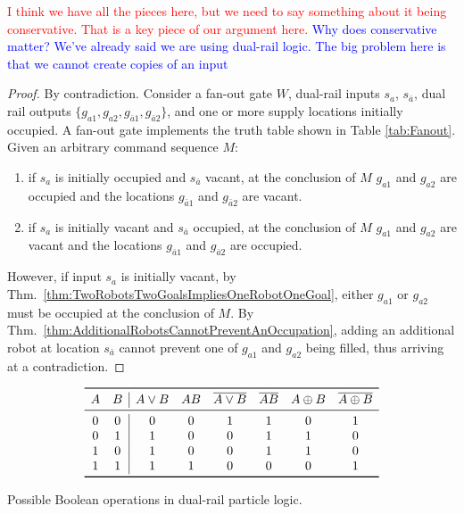 \documentclass[letterpaper, 10 pt, conference]{ieeeconf}
\begin{document}
\textcolor{red}{I think we have all the pieces here, but we need to say something about it being conservative. That is a key piece of our argument here. }
\textcolor{blue}{Why does conservative matter?  We've already said we are using dual-rail logic.  The big problem here is that we cannot create copies of an input}

\begin{proof} By contradiction.
Consider a  {\sc fan-out} gate $W$,  dual-rail inputs  $s_{a}$, $s_{\bar{a}}$, dual rail outputs  $\{g_{a1}, g_{a2},g_{\bar{a}1},g_{\bar{a}2}\}$, and one or more supply locations initially occupied. A {\sc fan-out} gate implements the truth table shown in Table \ref{tab:Fanout}. Given an arbitrary command sequence $M$:  
\begin{enumerate}
\item if $s_{a}$ is initially occupied and $s_{\bar{a}}$ vacant, at the conclusion of $M$ $g_{a1}$ and $g_{a2}$ are occupied and the locations  $g_{\bar{a}1}$ and $g_{\bar{a}2}$ are vacant.
\item if $s_{a}$ is initially vacant and $s_{\bar{a}}$ occupied, at the conclusion of $M$ $g_{a1}$ and $g_{a2}$ are vacant and the locations  $g_{\bar{a}1}$ and $g_{\bar{a}2}$ are occupied.
\end{enumerate}

However, if input $s_{a}$ is initially vacant, by Thm.~\ref{thm:TwoRobotsTwoGoalsImpliesOneRobotOneGoal}, either $g_{a1}$ or $g_{a2}$ must be occupied at the conclusion of $M$.  By Thm.~\ref{thm:AdditionalRobotsCannotPreventAnOccupation}, adding an additional robot at location $s_{\bar{a}}$ cannot prevent one of $g_{a1}$ and $g_{a2}$ being filled, thus arriving at a contradiction.
 \end{proof}

\begin{table}
\begin{displaymath}
\begin{array}{cc|cccccc}
\toprule
   A & B & A\lor{}B & AB & \overline{A\lor{}B} & \overline{AB} & A\oplus B & \overline{A\oplus B} \\
\midrule
0 & 0 & 0 & 0 & 1 & 1 & 0 & 1 \\
0 & 1 & 1 & 0 & 0 & 1 & 1 & 0 \\
1 & 0 & 1 & 0 & 0 & 1 & 1 & 0 \\
1 & 1 & 1 & 1 & 0 & 0 & 0 & 1 \\
\bottomrule
\end{array}
\end{displaymath}
  \caption{Possible Boolean operations in dual-rail particle logic.}
  \label{tab:dualRailParticleLogic}
\end{table}
\end{document}
